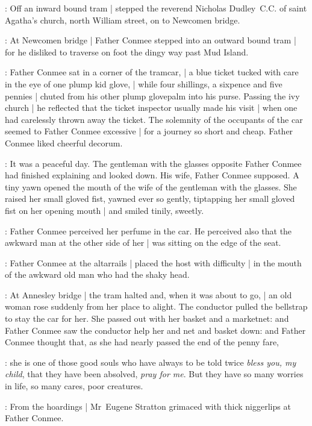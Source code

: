 :
Off an inward bound tram |
stepped the reverend Nicholas Dudley~C.C.
of saint Agatha's church, north William street,
on to Newcomen bridge.

:
At Newcomen bridge |
Father Conmee stepped into an outward bound tram |
for he disliked to traverse on foot the dingy way past Mud Island.

:
Father Conmee sat in a corner of the tramcar, |
a blue ticket tucked with care in the eye of one plump kid glove, |
while four shillings, a sixpence and five pennies |
chuted from his other plump glovepalm into his purse.
Passing the ivy church |
he reflected that the ticket inspector usually made his visit |
when one had carelessly thrown away the ticket.
The solemnity of the occupants of the car%
seemed to Father Conmee excessive |
for a journey so short and cheap.
Father Conmee liked cheerful decorum.

:
It was a peaceful day.
The gentleman with the glasses opposite Father Conmee
had finished explaining and looked down.
His wife, Father Conmee supposed.
A tiny yawn opened the mouth of the wife of the gentleman with the glasses.
She raised her small gloved fist,
yawned ever so gently,
tiptapping her small gloved fist on her opening mouth |
and smiled tinily, sweetly.

:
Father Conmee perceived her perfume in the car.
He perceived also that the awkward man at the other side of her |
was sitting on the edge of the seat.%

:
Father Conmee at the altarrails |
placed the host with difficulty |
in the mouth of the awkward old man who had the shaky head.

:
At Annesley bridge |
the tram halted and, when it was about to go, |
an old woman rose suddenly from her place to alight.
The conductor pulled the bellstrap to stay the car for her.
She passed out with her basket and a marketnet:
and Father Conmee saw the conductor help her and net and basket down:
and Father Conmee thought
that, as she had nearly passed the end of the penny fare,

\conmeeint:
she is one of those good souls who have always to be told twice
\emph{bless you, my child},
that they have been absolved,
\emph{pray for me}.
But they have so many worries in life,%
so many cares, poor creatures.

:
From the hoardings |
Mr~Eugene Stratton grimaced with thick niggerlips at Father Conmee.

